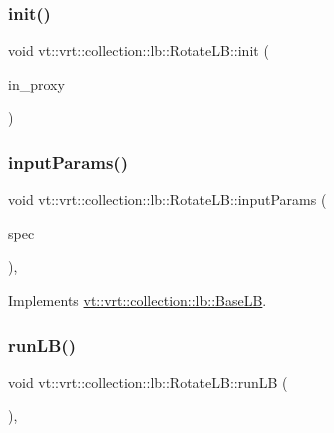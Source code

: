\subsubsection{\texorpdfstring{init()}{init()}}
{\footnotesize\ttfamily void vt\+::vrt\+::collection\+::lb\+::\+Rotate\+L\+B\+::init (\begin{DoxyParamCaption}\item[{\hyperlink{structvt_1_1objgroup_1_1proxy_1_1_proxy}{objgroup\+::proxy\+::\+Proxy}$<$ \hyperlink{structvt_1_1vrt_1_1collection_1_1lb_1_1_rotate_l_b}{Rotate\+LB} $>$}]{in\+\_\+proxy }\end{DoxyParamCaption})}

\mbox{\label{structvt_1_1vrt_1_1collection_1_1lb_1_1_rotate_l_b_a70fc0a77f387632fc57805950b63f443}} 
\subsubsection{\texorpdfstring{input\+Params()}{inputParams()}}
{\footnotesize\ttfamily void vt\+::vrt\+::collection\+::lb\+::\+Rotate\+L\+B\+::input\+Params (\begin{DoxyParamCaption}\item[{\hyperlink{structvt_1_1vrt_1_1collection_1_1balance_1_1_spec_entry}{balance\+::\+Spec\+Entry} $\ast$}]{spec }\end{DoxyParamCaption})\hspace{0.3cm}{\ttfamily [override]}, {\ttfamily [virtual]}}



Implements \hyperlink{structvt_1_1vrt_1_1collection_1_1lb_1_1_base_l_b_a555e29aadfd428383464d6dd007506b6}{vt\+::vrt\+::collection\+::lb\+::\+Base\+LB}.

\mbox{\label{structvt_1_1vrt_1_1collection_1_1lb_1_1_rotate_l_b_af54a83925b1bbe05052c475523110e98}} 
\subsubsection{\texorpdfstring{run\+L\+B()}{runLB()}}
{\footnotesize\ttfamily void vt\+::vrt\+::collection\+::lb\+::\+Rotate\+L\+B\+::run\+LB (\begin{DoxyParamCaption}\item[{\hyperlink{namespacevt_a876a9d0cd5a952859c72de8a46881442}{Time\+Type}}]{ }\end{DoxyParamCaption})\hspace{0.3cm}{\ttfamily [override]}, {\ttfamily [virtual]}}



